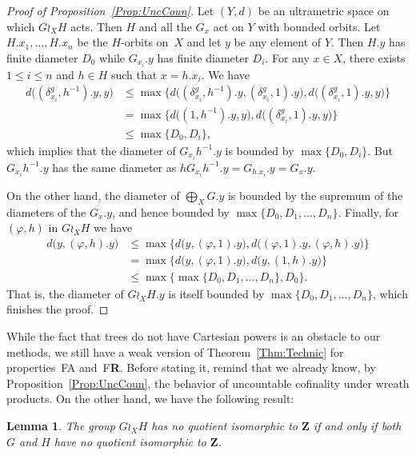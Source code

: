 \documentclass[a4paper]{article}
\newtheorem{lem}{Lemma}[section]
\theoremstyle{definition}
\newcommand*{\field}[1]{\mathbf{#1}}
\newcommand*{\Z}{\field{Z}}
\newcommand*{\FA}{FA}
\newcommand*{\FR}{F\textbf{R}}
\begin{document}
\begin{proof}[Proof of Proposition~\ref{Prop:UncCoun}]
Let $(Y,d)$ be an ultrametric space on which $G\wr_XH$ acts.
Then $H$ and all the $G_x$ act on $Y$ with bounded orbits.
Let $H.x_1,\dots, H.x_n$ be the $H$-orbits on~$X$ and let $y$ be any element of $Y$.
Then $H.y$ has finite diameter $D_0$ while $G_{x_i}.y$ has finite diameter $D_i$.
For any $x\in X$, there exists $1\leq i\leq n$ and $h\in H$ such that $x=h.x_i$.
We have
\begin{align*}
	d\bigl((\delta_{x_i}^g,h^{-1}).y,y\bigr)&\leq\max\{d\bigl((\delta_{x_i}^g,h^{-1}).y,(\delta_{x_i}^g,1).y\bigr),d\bigl((\delta_{x_i}^g,1).y,y\bigr)\}\\
	&=\max\{d\bigl((1,h^{-1}).y,y\bigr),d\bigl((\delta_{x_i}^g,1).y,y\bigr)\}\\
	&\leq \max\{D_0,D_i\},
\end{align*}
which implies that the diameter of $G_{x_i}h^{-1}.y$ is bounded by $\max\{D_0,D_i\}$.
But $G_{x_i}h^{-1}.y$ has the same diameter as $hG_{x_i}h^{-1}.y=G_{h.x_i}.y=G_x.y$.

On the other hand, the diameter of $\bigoplus_XG.y$ is bounded by the supremum of the diameters of the $G_{x}.y$, and hence bounded by $\max\{D_0,D_1,\dots,D_n\}$.
Finally, for $(\varphi,h)$ in $G\wr_X H$ we have
\begin{align*}
	d\bigl(y,(\varphi,h).y\bigr)&\leq\max\{d\bigl(y,(\varphi,1).y\bigr),d\bigl((\varphi,1).y,(\varphi,h).y\bigr)\}\\
	&=\max\{d\bigl(y,(\varphi,1).y\bigr),d\bigl(y,(1,h).y\bigr)\}\\
	&\leq\max\{\max\{D_0,D_1,\dots,D_n\},D_0\}.
\end{align*}
That is, the diameter of $G\wr_XH.y$ is itself bounded by $\max\{D_0,D_1,\dots,D_n\}$, which finishes the proof.
\end{proof}
%
%
While the fact that trees do not have Cartesian powers is an obstacle to our methods, we still have a weak version of Theorem~\ref{Thm:Technic} for properties~\FA{} and~\FR.
Before stating it, remind that we already know, by Proposition~\ref{Prop:UncCoun}, the behavior of uncountable cofinality under wreath products.
On the other hand, we have the following result:
%
%
\begin{lem}\label{Lemma:Z}
The group $G\wr_XH$ has no quotient isomorphic to $\Z$ if and only if both $G$ and $H$ have no quotient isomorphic to $\Z$.
\end{lem}
\end{document}
